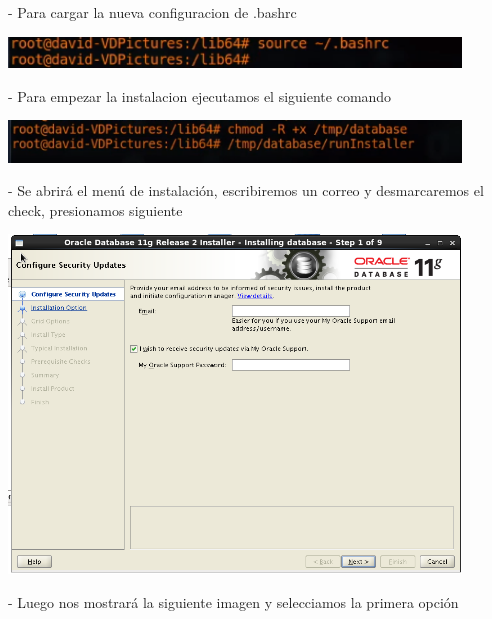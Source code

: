 \documentclass[12pt,letterpaper]{article}
\begin{document}
\begin{itemize}
- Para cargar la nueva configuracion de .bashrc\\
\end{itemize}

\begin{center}
	\includegraphics[width=12cm]{./Imagenes/42} 
\end{center}


\begin{itemize}
- Para empezar la instalacion ejecutamos el siguiente comando\\
\end{itemize}

\begin{center}
	\includegraphics[width=12cm]{./Imagenes/43} 
\end{center}


\begin{itemize}
- Se abrirá el menú de instalación, escribiremos un correo y desmarcaremos el check, presionamos siguiente \\
\end{itemize}

\begin{center}
	\includegraphics[width=12cm]{./Imagenes/44} 
\end{center}


\begin{itemize}
- Luego nos mostrará la siguiente imagen y selecciamos la primera opción  \\
\end{itemize}
\end{document}
